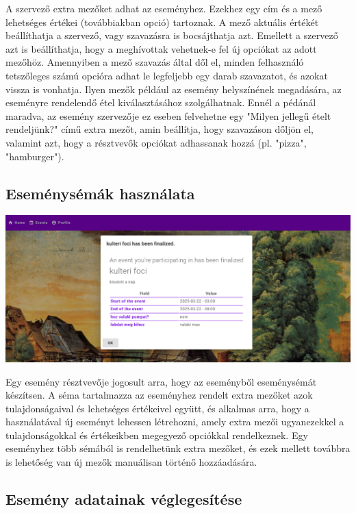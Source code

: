 \documentclass[a4paper,12pt]{report}
\theoremstyle{definition}
\theoremstyle{remark}
\begin{document}
A szervező extra mezőket adhat az eseményhez. Ezekhez egy cím és a mező lehetséges értékei (továbbiakban opció) tartoznak. A mező aktuális értékét beállíthatja a szervező, vagy szavazásra is bocsájthatja azt. Emellett a szervező azt is beállíthatja, hogy a meghívottak vehetnek-e fel új opciókat az adott mezőhöz. Amennyiben a mező szavazás által dől el, minden felhasználó tetszőleges számú opcióra adhat le legfeljebb egy darab szavazatot, és azokat vissza is vonhatja. Ilyen mezők például az esemény helyszínének megadására, az eseményre rendelendő étel kiválasztásához szolgálhatnak. Ennél a pédánál maradva, az esemény szervezője ez eseben felvehetne egy "Milyen jellegű ételt rendeljünk?" című extra mezőt, amin beállítja, hogy szavazáson dőljön el, valamint azt, hogy a résztvevők opciókat adhassanak hozzá (pl. "pizza", "hamburger"). 

	\subsection{Eseménysémák használata}

\begin{center}
\includegraphics[width=150mm]{notification}
\captionsetup{width=0.8\linewidth}
\end{center}

Egy esemény résztvevője jogosult arra, hogy az eseményből eseménysémát készítsen. A séma tartalmazza az eseményhez rendelt extra mezőket azok tulajdonságaival és lehetséges értékeivel együtt, és alkalmas arra, hogy a használatával új eseményt lehessen létrehozni, amely extra mezői ugyanezekkel a tulajdonságokkal és értékeikben megegyező opciókkal rendelkeznek. Egy eseményhez több sémából is rendelhetünk extra mezőket, és ezek mellett továbbra is lehetőség van új mezők manuálisan történő hozzáadására.

	\subsection{Esemény adatainak véglegesítése}
\end{document}
